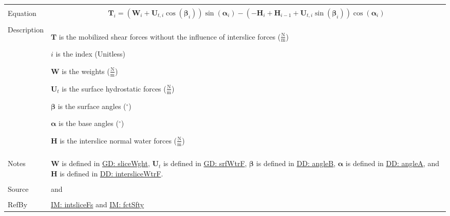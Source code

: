 \documentclass[12pt]{article}
\begin{document}
\begin{minipage}{\textwidth}
\begin{tabular}{>{\raggedright}p{}>{\raggedright\arraybackslash}p{}}
\\ \midrule \\
Equation & \begin{displaymath}
           {\mathbf{T}}_{i}=\left({\mathbf{W}}_{i}+{\mathbf{U}_{t,i}} \cos\left({\mathbf{β}}_{i}\right)\right) \sin\left({\mathbf{α}}_{i}\right)-\left(-{\mathbf{H}}_{i}+{\mathbf{H}}_{i-1}+{\mathbf{U}_{t,i}} \sin\left({\mathbf{β}}_{i}\right)\right) \cos\left({\mathbf{α}}_{i}\right)
           \end{displaymath}
\\ \midrule \\
Description & \begin{symbDescription}
              \item{$\mathbf{T}$ is the mobilized shear forces without the influence of interslice forces ($\frac{\text{N}}{\text{m}}$)}
              \item{$i$ is the index (Unitless)}
              \item{$\mathbf{W}$ is the weights ($\frac{\text{N}}{\text{m}}$)}
              \item{${\mathbf{U}_{t}}$ is the surface hydrostatic forces ($\frac{\text{N}}{\text{m}}$)}
              \item{$\mathbf{β}$ is the surface angles (${}^{\circ}$)}
              \item{$\mathbf{α}$ is the base angles (${}^{\circ}$)}
              \item{$\mathbf{H}$ is the interslice normal water forces ($\frac{\text{N}}{\text{m}}$)}
              \end{symbDescription}
\\ \midrule \\
Notes & $\mathbf{W}$ is defined in \hyperref[GD:sliceWght]{GD: sliceWght}, ${\mathbf{U}_{t}}$ is defined in \hyperref[GD:srfWtrF]{GD: srfWtrF}, $\mathbf{β}$ is defined in \hyperref[DD:angleB]{DD: angleB}, $\mathbf{α}$ is defined in \hyperref[DD:angleA]{DD: angleA}, and $\mathbf{H}$ is defined in \hyperref[DD:intersliceWtrF]{DD: intersliceWtrF}.
        
\\ \midrule \\
Source & \cite{chen2005} and \cite{karchewski2012}
         
\\ \midrule \\
RefBy & \hyperref[IM:intsliceFs]{IM: intsliceFs} and \hyperref[IM:fctSfty]{IM: fctSfty}
        
\\ \bottomrule
\end{tabular}
\end{minipage}
\end{document}
